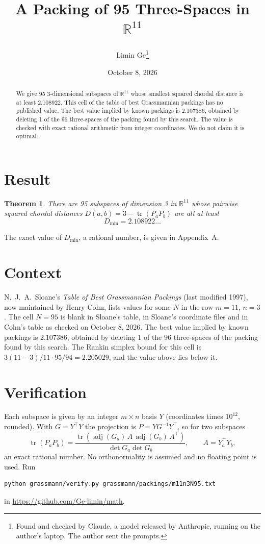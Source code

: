 \documentclass[11pt,a4paper]{article}
\title{A Packing of 95 Three-Spaces in $\mathbb{R}^{11}$}
\author{Limin Ge\thanks{Found and checked by Claude, a model released by Anthropic, running on the author's laptop. The author sent the prompts.}}
\date{October 8, 2026}
\newtheorem*{theorem}{Theorem}
\begin{document}
\maketitle
\begin{abstract}
We give 95 3-dimensional subspaces of $\mathbb{R}^{11}$ whose smallest squared chordal distance is at least 2.108922. This cell of the table of best Grassmannian packings has no published value. The best value implied by known packings is 2.107386, obtained by deleting 1 of the 96 three-spaces of the packing found by this search. The value is checked with exact rational arithmetic from integer coordinates. We do not claim it is optimal.
\end{abstract}

\section{Result}
\begin{theorem}
There are 95 subspaces of dimension 3 in $\mathbb{R}^{11}$ whose pairwise squared chordal distances $D(a,b) = 3 - \operatorname{tr}(P_aP_b)$ are all at least
\[ D_{\min} = 2.108922\ldots \]
\end{theorem}
The exact value of $D_{\min}$, a rational number, is given in Appendix~A.


\section{Context}
N.~J.~A.~Sloane's \emph{Table of Best Grassmannian Packings} (last modified 1997), now maintained by Henry Cohn, lists values for some $N$ in the row $m=11$, $n=3$. The cell $N=95$ is blank in Sloane's table, in Sloane's coordinate files and in Cohn's table as checked on October 8, 2026. The best value implied by known packings is 2.107386, obtained by deleting 1 of the 96 three-spaces of the packing found by this search. The Rankin simplex bound for this cell is $3(11-3)/11\cdot 95/94 = 2.205029$, and the value above lies below it.


\section{Verification}
Each subspace is given by an integer $m\times n$ basis $Y$ (coordinates times $10^{12}$, rounded). With $G=Y^\top Y$ the projection is $P=YG^{-1}Y^\top$, so for two subspaces
\[ \operatorname{tr}(P_aP_b)=\frac{\operatorname{tr}(\operatorname{adj}(G_a)\,A\,\operatorname{adj}(G_b)\,A^\top)}{\det G_a\det G_b},\qquad A=Y_a^\top Y_b, \]
an exact rational number. No orthonormality is assumed and no floating point is used. Run
\begin{verbatim}
python grassmann/verify.py grassmann/packings/m11n3N95.txt
\end{verbatim}
in \url{https://github.com/Ge-limin/math}.
\end{document}

